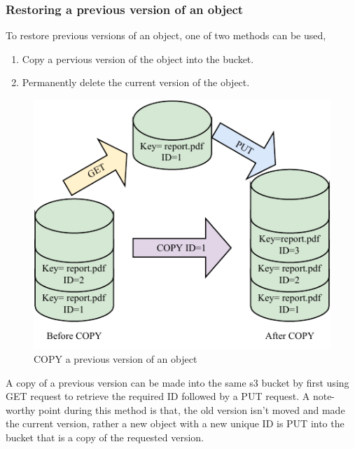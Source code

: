 \documentclass{home_assignment}
\begin{document}
    \subsubsection{Restoring a previous version of an object}
    To restore previous versions of an object, one of two methods can be used,
    \begin{enumerate}
        \item Copy a pervious version of the object into the bucket.
        \item Permanently delete the current version of the object.
    \end{enumerate}

    \begin{figure}[H]
        \centering
        \includegraphics[scale=1.3]{../Figures/versioning_copy}
        \caption{COPY a previous version of an object}
        \label{fig:copy}
    \end{figure}
    A copy of a previous version can be made into the same \acrshort{s3} bucket by first using GET request to retrieve the required ID followed by a PUT request. A note-worthy point during this method is that, the old version isn't moved and made the current version, rather a new object with a new unique ID is PUT into the bucket that is a copy of the requested version.
\end{document}
